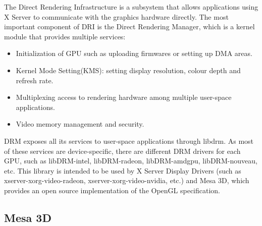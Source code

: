 \documentclass[12pt,a4paper,oneside]{article}
\begin{document}
The Direct Rendering Infrastructure is a subsystem that allows applications using
X Server to communicate with the graphics hardware directly. The most important
component of DRI is the Direct Rendering Manager, which is a kernel module that
provides multiple services:
\begin{itemize}
  \item Initialization of GPU such as uploading firmwares or setting up DMA areas.
  \item Kernel Mode Setting(KMS): setting display resolution, colour depth and
  refresh rate.
  \item Multiplexing access to rendering hardware among multiple user-space
  applications.
  \item Video memory management and security.
\end{itemize}
DRM exposes all its services to user-space applications through libdrm. As most
of these services are device-specific, there are different DRM drivers for each
GPU, such as libDRM-intel, libDRM-radeon, libDRM-amdgpu, libDRM-nouveau, etc.
This library is intended to be used by X Server Display Drivers (such as
xserver-xorg-video-radeon, xserver-xorg-video-nvidia, etc.) and Mesa 3D, which
provides an open source implementation of the OpenGL specification.

\subsection{Mesa 3D}
\end{document}
